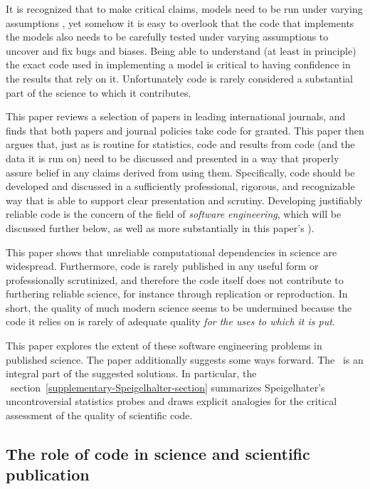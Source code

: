 It is recognized that to make critical claims, models need to be run under varying assumptions \cite{whitty}, yet somehow it is easy to overlook that the code that implements the models also needs to be carefully tested under varying assumptions to uncover and fix bugs and biases. Being able to understand (at least in principle) the exact code used in implementing a model is critical to having confidence in the results that rely on it. Unfortunately code is rarely considered a substantial part of the science to which it contributes. 

This paper reviews a selection of papers in leading international journals, and finds that both papers and journal policies take code for granted. This paper then argues that, just as is routine for statistics, code and results from code (and the data it is run on) need to be discussed and presented in a way that properly assure belief in any claims derived from using them. Specifically, code should be developed and discussed in a sufficiently professional, rigorous, and recognizable way that is able to support clear presentation and scrutiny. Developing justifiably reliable code is the concern of the field of \emph{software engineering}, which will be discussed further below, as well as more substantially in this paper's \supplement). 

This paper shows that unreliable computational dependencies in science are widespread. Furthermore, code is rarely published in any useful form or professionally scrutinized, and therefore the code itself does not contribute to furthering reliable science, for instance through replication or reproduction. In short, the quality of much modern science seems to be undermined because the code it relies on is rarely of adequate quality \emph{for the uses to which it is put}. 

This paper explores the extent of these software engineering problems in published science. The paper additionally suggests some ways forward. The \supplement\ is an integral part of the suggested solutions. In particular, the \supplement\ section~\ref{supplementary-Speigelhalter-section} summarizes Speigelhater's uncontroversial statistics probes and draws explicit analogies for the critical assessment of the quality of scientific code.

\subsection{The role of code in science and scientific publication}


